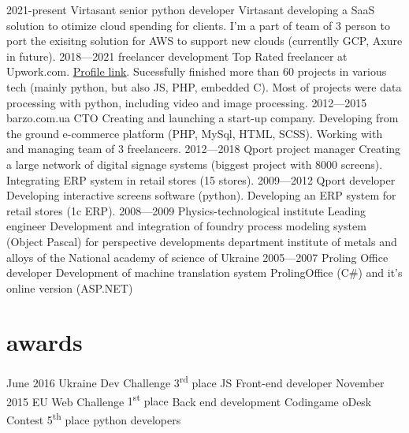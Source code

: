 \documentclass[hidelinks,a4paper]{cv}
\begin{document}
\begin{entrylist}
  \entry
    {2021-present}
    {Virtasant}
    {senior python developer}
    {Virtasant developing a SaaS solution to otimize cloud spending for clients. I'm a part of team of 3 person to port the exisitng solution for AWS to support new clouds (currentlly GCP, Axure in future).}
  \entry
    {2018—2021}
    {freelancer}
    {development}
    {Top Rated freelancer at Upwork.com. \href{https://www.upwork.com/freelancers/~019390ff2ea4f4d883}{\underline{Profile link}}. Sucessfully finished more than 60 projects in various tech (mainly python, but also JS, PHP, embedded C). Most of projects were data processing with python, including video and image processing.}
  \entry 
    {2012—2015}
    {barzo.com.ua}
    {CTO}
    {Creating and launching a start-up company. Developing from the ground e-commerce platform (PHP, MySql, HTML, SCSS). Working with and managing team of 3 freelancers.
    }
  \entry
    {2012—2018}
    {Qport}
    {project manager}
    {
    Creating a large network of digital signage systems (biggest project with 8000 screens).
    Integrating ERP system in retail stores (15 stores).
    }
  \entry
    {2009—2012}
    {Qport}
    {developer}
    {
    Developing interactive screens software (python). 
    Developing an ERP system for retail stores (1c ERP).
    }
  \entry
    {2008—2009} 
    {Physics-technological institute}
    {Leading engineer}
    {Development and integration of foundry process modeling system (Object Pascal) for perspective developments department institute of metals and alloys of the National academy of science of Ukraine}
  \entry
    {2005—2007}
    {Proling Office}
    {developer}
    {Development of machine translation system ProlingOffice (C\#) and it's online version (ASP.NET)}
\end{entrylist}

\newpage{}

\section{awards}

\begin{entrylist}
  \entry
   {June 2016}
   {Ukraine Dev Challenge}
   {3\textsuperscript{rd} place}
   {JS Front-end developer}
  \entry  
   {November 2015}
   {EU Web Challenge}
   {1\textsuperscript{st} place}
   {Back end development}
  \entry  
   {}
   {Codingame oDesk Contest}
   {5\textsuperscript{th} place}
   {python developers}
\end{entrylist}
\end{document}
